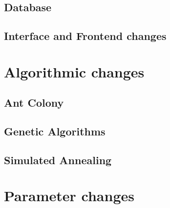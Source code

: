 \subsection{Database}
\label{subsection:database}

\subsection{Interface and Frontend changes}
\label{subsec:interfaceAndFrontendChanges}

\section{Algorithmic changes}
\label{sec:algorithmicChanges}

\subsection{Ant Colony}
\label{subsec:antColonyImplementation}

\subsection{Genetic Algorithms}
\label{subsec:geneticAlgorithmsImplementation}

\subsection{Simulated Annealing}
\label{subsec:simulatedAnnealingImplementation}

\section{Parameter changes}
\label{sec:parameterChanges}

